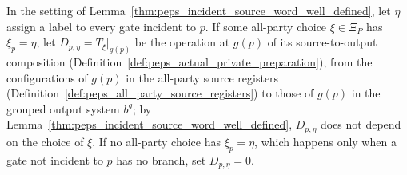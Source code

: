 \begin{definition}
    \label{def:peps_incident_source_word}
    \leanok
    In the setting of Lemma~\ref{thm:peps_incident_source_word_well_defined},
    let $\eta$ assign a label to every gate incident to $p$. If some all-party
    choice $\xi\in\Xi_P$ has $\xi_p=\eta$, let $D_{p,\eta}=T_\xi|_{g(p)}$ be the
    operation at $g(p)$ of its source-to-output composition
    (Definition~\ref{def:peps_actual_private_preparation}), from the
    configurations of $g(p)$ in the all-party source registers
    (Definition~\ref{def:peps_all_party_source_registers}) to those of $g(p)$ in
    the grouped output system $b^g$; by
    Lemma~\ref{thm:peps_incident_source_word_well_defined}, $D_{p,\eta}$ does
    not depend on the choice of $\xi$. If no all-party choice has $\xi_p=\eta$,
    which happens only when a gate not incident to $p$ has no branch, set
    $D_{p,\eta}=0$.
\end{definition}
